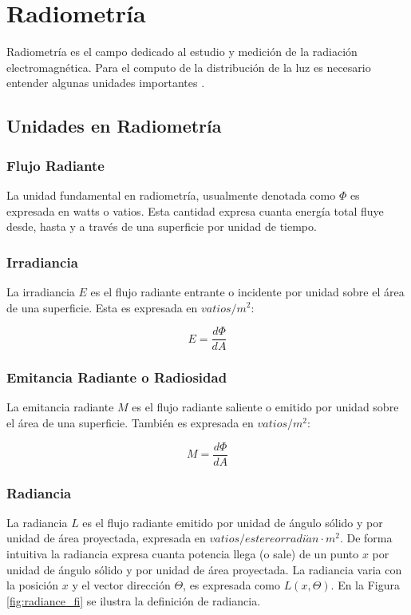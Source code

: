 \section{Radiometría}
Radiometría es el campo dedicado al estudio y medición de la radiación electromagnética. Para el computo de la distribución de la luz es necesario entender algunas unidades importantes \cite{advanced_gi2006}.

\subsection{Unidades en Radiometría}

\subsubsection{Flujo Radiante}
La unidad fundamental en radiometría, usualmente denotada como $\Phi$ es expresada en watts o vatios. Esta cantidad expresa cuanta energía total fluye desde, hasta y a través de una superficie por unidad de tiempo.
\subsubsection{Irradiancia}
\label{subsubsec:irradiance}
La irradiancia $E$ es el flujo radiante entrante o incidente por unidad sobre el área de una superficie. Esta es expresada en $vatios/m^2$:

\begin{equation}
    E = \frac{d\Phi}{dA}
	\label{eq:irradiance_eq}
\end{equation}

\subsubsection{Emitancia Radiante o Radiosidad}
La emitancia radiante $M$ es el flujo radiante saliente o emitido por unidad sobre el área de una superficie. También es expresada en $vatios/m^2$:

\begin{equation}
    M = \frac{d\Phi}{dA}
	\label{eq:radiosity_eq}
\end{equation}

\subsubsection{Radiancia}
La radiancia $L$ es el flujo radiante emitido por unidad de ángulo sólido y por unidad de área proyectada, expresada en $vatios/estereorradi\acute{a}n\cdot m^2$. De forma intuitiva la radiancia expresa cuanta potencia llega (o sale) de un punto $x$ por unidad de ángulo sólido y por unidad de área proyectada. La radiancia varia con la posición $x$ y el vector dirección $\Theta$, es expresada como $L(x,\Theta)$. En la Figura \ref{fig:radiance_fi} se ilustra la definición de radiancia.

